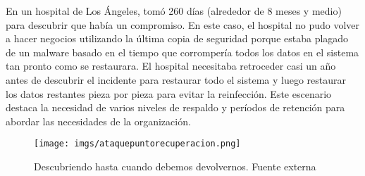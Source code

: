\begin{tcolorbox}[colback=gray!5!white,colframe=orange!60!gray,title=Caso]En un hospital de Los Ángeles, tomó 260 días (alrededor de 8 meses y medio) para descubrir que había un compromiso. En este caso, el hospital no pudo volver a hacer negocios utilizando la última copia de seguridad porque estaba plagado de un malware basado en el tiempo que corrompería todos los datos en el sistema tan pronto como se restaurara. El hospital necesitaba retroceder casi un año antes de descubrir el incidente para restaurar todo el sistema y luego restaurar los datos restantes pieza por pieza para evitar la reinfección. Este escenario destaca la necesidad de varios niveles de respaldo y períodos de retención para abordar las necesidades de la organización.
\end{tcolorbox}
\begin{figure}[H]
    \centering
    \texttt{[image: imgs/ataquepuntorecuperacion.png]}
    \caption{Descubriendo hasta cuando debemos devolvernos. Fuente externa}
    \label{fig:enter-label}
\end{figure}
